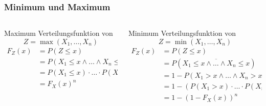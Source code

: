 %
%
%
\bgroup
\begin{frame}[t]
\setlength{\abovedisplayskip}{5pt}
\setlength{\belowdisplayskip}{5pt}
\frametitle{Minimum und Maximum}
\vspace{-20pt}
\begin{columns}[t,onlytextwidth]
\begin{column}{0.48\textwidth}
\begin{block}{Maximum}
Verteilungsfunktion von
\[
Z=\operatorname{max}(X_1,\dots,X_n)
\]
\begin{align*}
F_Z(x)
&=
P(Z\le x)
\\
&=
P(X_1\le x\wedge\dots\wedge X_n\le x)
\\
&=
P(X_1\le x)\cdot \ldots\cdot P(X_n\le x)
\\
&=
F_X(x)^n
\end{align*}
\end{block}
\end{column}
\begin{column}{0.48\textwidth}
\begin{block}{Minimum}
Verteilungsfunktion von
\[
Z=\operatorname{min}(X_1,\dots,X_n)
\]
\begin{align*}
F_Z(x)
&=
P(Z\le x)
\\
&=P(\overline{
X_1\le x\wedge\dots\wedge X_n \le x
})
\\
&=
1-P(
X_1> x\wedge\dots\wedge X_n > x
)
\\
&=
1-(P(X_1>x)\cdot\ldots\cdot P(X_n>x))
\\
&=
1-(1-F_X(x))^n
\end{align*}
\end{block}
\end{column}
\end{columns}
\end{frame}
\egroup

